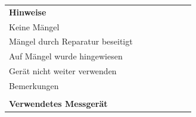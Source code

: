 \documentclass[11pt,a4paper,final,oneside,notitlepage]{report}
\begin{document}
\begin{tabularx}{\textwidth}{|p{}| p{}|p{}|p{}|}
		\\
		\hline
		\rule{0pt}{15pt}\textbf{Hinweise} & &\cellcolor{gray!10} &
		\\[.25ex]
		{\scriptsize Keine Mängel } &
		\raggedleft\arraybackslash\makebox[0pt][l]{$\square$}\raisebox{.15ex}{\hspace{0.1em}}\,\,\,\,\,\,\, &
		\cellcolor{gray!10}\raggedleft\arraybackslash\makebox[0pt][l]{$\square$}\raisebox{.15ex}{\hspace{0.1em}}\,\,\,\,\,\,\, &
		\raggedleft\arraybackslash\makebox[0pt][l]{$\square$}\raisebox{.15ex}{\hspace{0.1em}}\,\,\,\,\,\,\, \\
		{\scriptsize Mängel durch Reparatur beseitigt } &
		\raggedleft\arraybackslash\makebox[0pt][l]{$\square$}\raisebox{.15ex}{\hspace{0.1em}}\,\,\,\,\,\,\, &
		\cellcolor{gray!10}\raggedleft\arraybackslash\makebox[0pt][l]{$\square$}\raisebox{.15ex}{\hspace{0.1em}}\,\,\,\,\,\,\, &
		\raggedleft\arraybackslash\makebox[0pt][l]{$\square$}\raisebox{.15ex}{\hspace{0.1em}}\,\,\,\,\,\,\, \\
		{\scriptsize Auf Mängel wurde hingewiesen } &
		\raggedleft\arraybackslash\makebox[0pt][l]{$\square$}\raisebox{.15ex}{\hspace{0.1em}}\,\,\,\,\,\,\, &
		\cellcolor{gray!10}\raggedleft\arraybackslash\makebox[0pt][l]{$\square$}\raisebox{.15ex}{\hspace{0.1em}}\,\,\,\,\,\,\, &
		\raggedleft\arraybackslash\makebox[0pt][l]{$\square$}\raisebox{.15ex}{\hspace{0.1em}}\,\,\,\,\,\,\, \\
		{\scriptsize Gerät nicht weiter verwenden } &
		\raggedleft\arraybackslash\makebox[0pt][l]{$\square$}\raisebox{.15ex}{\hspace{0.1em}}\,\,\,\,\,\,\, &
		\cellcolor{gray!10}\raggedleft\arraybackslash\makebox[0pt][l]{$\square$}\raisebox{.15ex}{\hspace{0.1em}}\,\,\,\,\,\,\, &
		\raggedleft\arraybackslash\makebox[0pt][l]{$\square$}\raisebox{.15ex}{\hspace{0.1em}}\,\,\,\,\,\,\, \\
		\scriptsize{Bemerkungen} & &\cellcolor{gray!10} &
		\\
		&
		&\cellcolor{gray!10}
		& \\
		\hline
		\rule{0pt}{15pt}\textbf{Verwendetes Messgerät} & &\cellcolor{gray!10} &
		\\[.25ex]

\end{tabularx}
\end{document}
